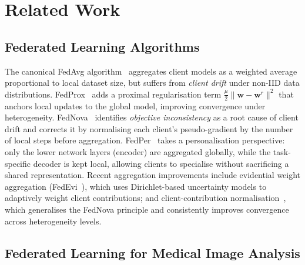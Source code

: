 \section{Related Work}
\label{sec:related}

\subsection{Federated Learning Algorithms}

The canonical FedAvg algorithm~\cite{mcmahan2017fedavg} aggregates client
models as a weighted average proportional to local dataset size, but suffers
from \emph{client drift} under non-IID data distributions.
FedProx~\cite{li2020fedprox} adds a proximal regularisation term
$\frac{\mu}{2}\|\mathbf{w}-\mathbf{w}^r\|^2$ that anchors local updates to
the global model, improving convergence under heterogeneity.
FedNova~\cite{wang2020fednova} identifies \emph{objective inconsistency} as
a root cause of client drift and corrects it by normalising each client's
pseudo-gradient by the number of local steps before aggregation.
FedPer~\cite{arivazhagan2019fedper} takes a personalisation perspective:
only the lower network layers (encoder) are aggregated globally, while the
task-specific decoder is kept local, allowing clients to specialise without
sacrificing a shared representation.
Recent aggregation improvements include evidential weight aggregation
(FedEvi~\cite{chen2024fedevi}), which uses Dirichlet-based uncertainty
models to adaptively weight client contributions; and client-contribution
normalisation~\cite{linardos2024fets}, which generalises the FedNova
principle and consistently improves convergence across heterogeneity levels.

\subsection{Federated Learning for Medical Image Analysis}

